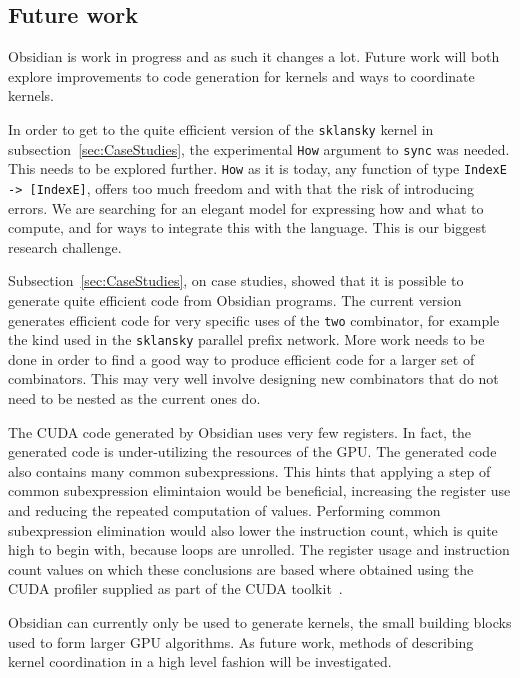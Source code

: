 \FloatBarrier
\subsection{Future work}

Obsidian is work in progress and as such it changes a lot. Future work will both
explore improvements to code generation for kernels and ways to coordinate kernels.

In order to get to the quite efficient version of the {\tt sklansky} kernel 
in subsection~\ref{sec:CaseStudies}, the experimental {\tt How} argument to {\tt sync} was needed. 
This needs to be 
explored further. {\tt How} as it is today, any function of type
{\tt IndexE -> [IndexE]}, offers too much freedom and with that the risk of
introducing errors. We are searching for an elegant model for expressing how and what 
to compute, and for ways to integrate this with
the language. This is our biggest research challenge.

Subsection~\ref{sec:CaseStudies}, on case studies, showed that it is possible to
generate quite efficient code from Obsidian programs. The current version 
generates efficient code for very specific uses of the {\tt two} combinator, 
for example the kind used in the {\tt sklansky} parallel prefix network. More 
work needs to be done in order to find a good way to produce efficient code 
for a larger set of combinators. 
This may very well involve designing new combinators that do not need
to be nested as the current ones do.

The CUDA code generated by Obsidian uses very few registers. In fact,
the generated code is under-utilizing the resources of the GPU. The generated 
code also contains many common subexpressions. This hints that applying a 
step of common subexpression elimintaion would be beneficial, increasing 
the register use and reducing the repeated computation of values. Performing
common subexpression elimination would also lower the instruction count,
which is quite high to begin with, because loops are unrolled. 
The register usage and instruction count values on which these conclusions 
are based where obtained using the CUDA profiler supplied as part of the 
CUDA toolkit~.

Obsidian can currently only be used to generate kernels, the small 
building blocks used to form larger GPU algorithms. As future work, 
methods of describing kernel coordination in a high level fashion will 
be investigated.

